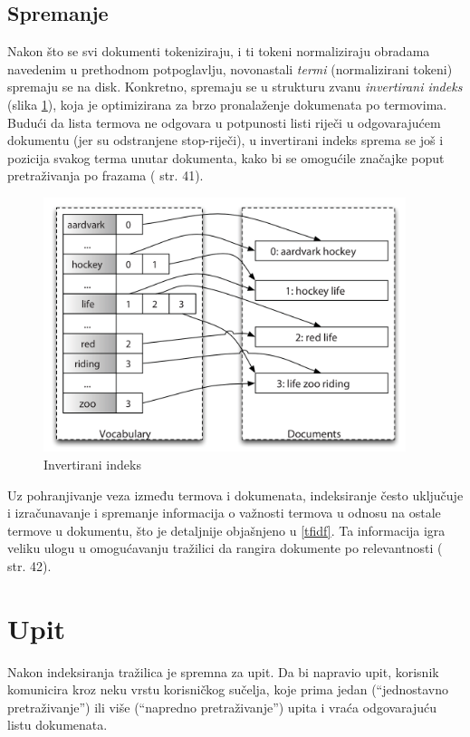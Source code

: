\documentclass[a4paper,twoside,12pt]{scrreprt}
\begin{document}
\subsection{Spremanje}

Nakon što se svi dokumenti tokeniziraju, i ti tokeni normaliziraju obradama navedenim u prethodnom potpoglavlju, novonastali \textit{termi} (normalizirani tokeni) spremaju se na disk. Konkretno, spremaju se u strukturu zvanu \textit{invertirani indeks} (slika \ref{inverted_index}), koja je optimizirana za brzo pronalaženje dokumenata po termovima. Budući da lista termova ne odgovara u potpunosti listi riječi u odgovarajućem dokumentu (jer su odstranjene stop-riječi), u invertirani indeks sprema se još i pozicija svakog terma unutar dokumenta, kako bi se omogućile značajke poput pretraživanja po frazama (\cite{taming} str. 41).

\begin{figure}[H]
  \centering
  \includegraphics[width=300pt]{inverted_index}
  \caption{Invertirani indeks}
  \label{inverted_index}
\end{figure}

Uz pohranjivanje veza između termova i dokumenata, indeksiranje često uključuje i izračunavanje i spremanje informacija o važnosti termova u odnosu na ostale termove u dokumentu, što je detaljnije objašnjeno u \ref{tfidf}. Ta informacija igra veliku ulogu u omogućavanju tražilici da rangira dokumente po relevantnosti (\cite{taming} str. 42).

\section{Upit}

Nakon indeksiranja tražilica je spremna za upit. Da bi napravio upit, korisnik komunicira kroz neku vrstu korisničkog sučelja, koje prima jedan (``jednostavno pretraživanje'') ili više (``napredno pretraživanje'') upita i vraća odgovarajuću listu dokumenata.
\end{document}
